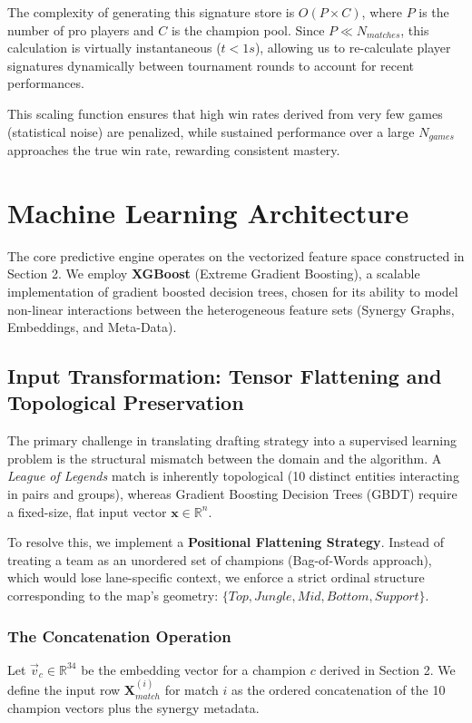 \documentclass[12pt, a4paper]{article}
\begin{document}
    The complexity of generating this signature store is $O(P \times C)$, where $P$ is the number of pro players and $C$ is the champion pool. Since $P \ll N_{matches}$, this calculation is virtually instantaneous ($t < 1s$), allowing us to re-calculate player signatures dynamically between tournament rounds to account for recent performances.

    This scaling function ensures that high win rates derived from very few games (statistical noise) are penalized, while sustained performance over a large $N_{games}$ approaches the true win rate, rewarding consistent mastery.

    \newpage

    \section{Machine Learning Architecture}

    The core predictive engine operates on the vectorized feature space constructed in Section 2. We employ \textbf{XGBoost} (Extreme Gradient Boosting), a scalable implementation of gradient boosted decision trees, chosen for its ability to model non-linear interactions between the heterogeneous feature sets (Synergy Graphs, Embeddings, and Meta-Data).

    \subsection{Input Transformation: Tensor Flattening and Topological Preservation}

    The primary challenge in translating drafting strategy into a supervised learning problem is the structural mismatch between the domain and the algorithm. A \textit{League of Legends} match is inherently topological (10 distinct entities interacting in pairs and groups), whereas Gradient Boosting Decision Trees (GBDT) require a fixed-size, flat input vector $\mathbf{x} \in \mathbb{R}^n$.

    To resolve this, we implement a \textbf{Positional Flattening Strategy}. Instead of treating a team as an unordered set of champions (Bag-of-Words approach), which would lose lane-specific context, we enforce a strict ordinal structure corresponding to the map's geometry: $\{Top, Jungle, Mid, Bottom, Support\}$.

    \subsubsection{The Concatenation Operation}
    Let $\vec{v}_{c} \in \mathbb{R}^{34}$ be the embedding vector for a champion $c$ derived in Section 2. We define the input row $\mathbf{X}_{match}^{(i)}$ for match $i$ as the ordered concatenation of the 10 champion vectors plus the synergy metadata.
\end{document}

